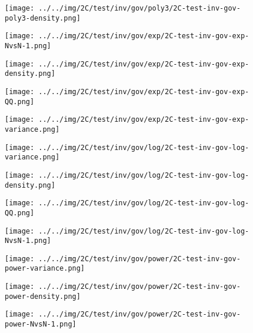 \begin{figure}[H]
\centering	\texttt{[image: ../../img/2C/test/inv/gov/poly3/2C-test-inv-gov-poly3-density.png]}
\end{figure}
\begin{figure}[H]
\centering	\texttt{[image: ../../img/2C/test/inv/gov/exp/2C-test-inv-gov-exp-NvsN-1.png]}
\end{figure}
\begin{figure}[H]
\centering	\texttt{[image: ../../img/2C/test/inv/gov/exp/2C-test-inv-gov-exp-density.png]}
\end{figure}
\begin{figure}[H]
\centering	\texttt{[image: ../../img/2C/test/inv/gov/exp/2C-test-inv-gov-exp-QQ.png]}
\end{figure}
\begin{figure}[H]
\centering	\texttt{[image: ../../img/2C/test/inv/gov/exp/2C-test-inv-gov-exp-variance.png]}
\end{figure}
\begin{figure}[H]
\centering	\texttt{[image: ../../img/2C/test/inv/gov/log/2C-test-inv-gov-log-variance.png]}
\end{figure}
\begin{figure}[H]
\centering	\texttt{[image: ../../img/2C/test/inv/gov/log/2C-test-inv-gov-log-density.png]}
\end{figure}
\begin{figure}[H]
\centering	\texttt{[image: ../../img/2C/test/inv/gov/log/2C-test-inv-gov-log-QQ.png]}
\end{figure}
\begin{figure}[H]
\centering	\texttt{[image: ../../img/2C/test/inv/gov/log/2C-test-inv-gov-log-NvsN-1.png]}
\end{figure}
\begin{figure}[H]
\centering	\texttt{[image: ../../img/2C/test/inv/gov/power/2C-test-inv-gov-power-variance.png]}
\end{figure}
\begin{figure}[H]
\centering	\texttt{[image: ../../img/2C/test/inv/gov/power/2C-test-inv-gov-power-density.png]}
\end{figure}
\begin{figure}[H]
\centering	\texttt{[image: ../../img/2C/test/inv/gov/power/2C-test-inv-gov-power-NvsN-1.png]}
\end{figure}
